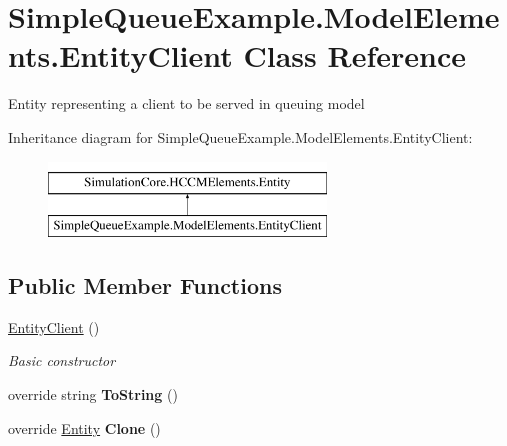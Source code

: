 \hypertarget{class_simple_queue_example_1_1_model_elements_1_1_entity_client}{}\section{Simple\+Queue\+Example.\+Model\+Elements.\+Entity\+Client Class Reference}
\label{class_simple_queue_example_1_1_model_elements_1_1_entity_client}


Entity representing a client to be served in queuing model  


Inheritance diagram for Simple\+Queue\+Example.\+Model\+Elements.\+Entity\+Client\+:\begin{figure}[H]
\begin{center}
\leavevmode
\includegraphics[height=2.000000cm]{class_simple_queue_example_1_1_model_elements_1_1_entity_client}
\end{center}
\end{figure}
\subsection*{Public Member Functions}
\begin{DoxyCompactItemize}
\item 
\hyperlink{class_simple_queue_example_1_1_model_elements_1_1_entity_client_a6cc78080cd16797387f05be16d53bbe9}{Entity\+Client} ()
\begin{DoxyCompactList}\small\item\em Basic constructor \end{DoxyCompactList}\item 
override string {\bfseries To\+String} ()\hypertarget{class_simple_queue_example_1_1_model_elements_1_1_entity_client_ab19bb1b5e02f8e27a0f6ed687126eaee}{}\label{class_simple_queue_example_1_1_model_elements_1_1_entity_client_ab19bb1b5e02f8e27a0f6ed687126eaee}

\item 
override \hyperlink{class_simulation_core_1_1_h_c_c_m_elements_1_1_entity}{Entity} {\bfseries Clone} ()\hypertarget{class_simple_queue_example_1_1_model_elements_1_1_entity_client_a26f629ca054934ed8a3b0bfc89711721}{}\label{class_simple_queue_example_1_1_model_elements_1_1_entity_client_a26f629ca054934ed8a3b0bfc89711721}

\end{DoxyCompactItemize}
